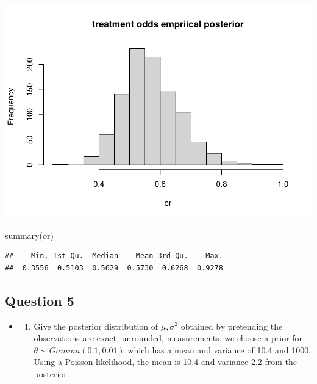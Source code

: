 \documentclass[
]{book}
\newenvironment{Shaded}{\begin{snugshade}}{\end{snugshade}}
\newcommand{\FunctionTok}[1]{\textcolor[rgb]{0.00,0.00,0.00}{#1}}
\newcommand{\NormalTok}[1]{#1}
\providecommand{\tightlist}{%
  \setlength{\itemsep}{0pt}\setlength{\parskip}{0pt}}
\theoremstyle{definition}
\theoremstyle{definition}
\theoremstyle{definition}
\theoremstyle{definition}
\theoremstyle{remark}
\begin{document}
\includegraphics{_main_files/figure-latex/unnamed-chunk-38-2.pdf}

\begin{Shaded}
\begin{Highlighting}[]
  \FunctionTok{summary}\NormalTok{(or)}
\end{Highlighting}
\end{Shaded}

\begin{verbatim}
##    Min. 1st Qu.  Median    Mean 3rd Qu.    Max. 
##  0.3556  0.5103  0.5629  0.5730  0.6268  0.9278
\end{verbatim}

\hypertarget{question-5}{%
\subsection*{Question 5}\label{question-5}}

\begin{itemize}
\item
  \begin{enumerate}
  \def\labelenumi{(\alph{enumi})}
  \tightlist
  \item
    Give the posterior distribution of \(\mu, \sigma^2\) obtained by pretending the observations are exact, unrounded, measurements. we choose a prior for \(\theta \sim Gamma(0.1,0.01)\) which has a mean and variance of 10.4 and 1000. Using a Poisson likelihood, the mean is 10.4 and variance 2.2 from the posterior.
  \end{enumerate}
\end{itemize}
\end{document}
